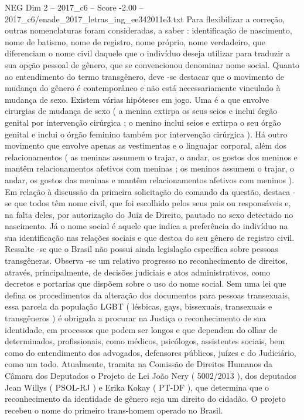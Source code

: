 \begin{textsample}{NEG Dim 2 – 2017\_c6 – Score -2.00 – 2017\_c6/enade\_2017\_letras\_ing\_ee342011e3.txt}
Para flexibilizar a correção, outras nomenclaturas foram consideradas, a saber : identificação de nascimento, nome de batismo, nome de registro, nome próprio, nome verdadeiro, que diferenciam o nome civil daquele que o indivíduo deseja utilizar para traduzir a sua opção pessoal de gênero, que se convencionou denominar nome social.
Quanto ao entendimento do termo transgênero, deve -se destacar que o movimento de mudança do gênero é contemporâneo e não está necessariamente vinculado à mudança de sexo.
Existem várias hipóteses em jogo.
Uma é a que envolve cirurgias de mudança de sexo ( a menina extirpa os seus seios e inclui órgão genital por intervenção cirúrgica ; o menino inclui seios e extirpa o seu órgão genital e inclui o órgão feminino também por intervenção cirúrgica ).
Há outro movimento que envolve apenas as vestimentas e o linguajar corporal, além dos relacionamentos ( as meninas assumem o trajar, o andar, os gostos dos meninos e mantêm relacionamentos afetivos com meninas ; os meninos assumem o trajar, o andar, os gostos das meninas e mantêm relacionamentos afetivos com meninos ).
Em relação à discussão da primeira solicitação do comando da questão, destaca -se que todos têm nome civil, que foi escolhido pelos seus pais ou responsáveis e, na falta deles, por autorização do Juiz de Direito, pautado no sexo detectado no nascimento.
Já o nome social é aquele que indica a preferência do indivíduo na sua identificação nas relações sociais e que destoa do seu gênero de registro civil.
Ressalte -se que o Brasil não possui ainda legislação específica sobre pessoas transgêneras.
Observa -se um relativo progresso no reconhecimento de direitos, através, principalmente, de decisões judiciais e atos administrativos, como decretos e portarias que dispõem sobre o uso do nome social.
Sem uma lei que defina os procedimentos da alteração dos documentos para pessoas transexuais, essa parcela da população LGBT ( lésbicas, gays, bissexuais, transexuais e transgêneros ) é obrigada a procurar na Justiça o reconhecimento de sua identidade, em processos que podem ser longos e que dependem do olhar de determinados, profissionais, como médicos, psicólogos, assistentes sociais, bem como do entendimento dos advogados, defensores públicos, juízes e do Judiciário, como um todo.
Atualmente, tramita na Comissão de Direitos Humanos da Câmara dos Deputados o Projeto de Lei João Nery ( 5002/2013 ), dos deputados Jean Willys ( PSOL-RJ ) e Erika Kokay ( PT-DF ), que determina que o reconhecimento da identidade de gênero seja um direito do cidadão.
O projeto recebeu o nome do primeiro trans-homem operado no Brasil.

\end{textsample}

